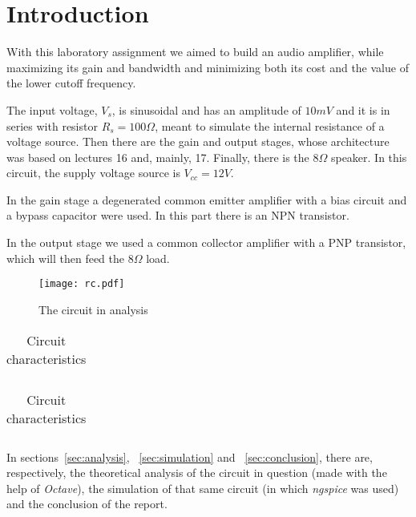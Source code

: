 \section{Introduction}
\label {sec:introduction}


With this laboratory assignment we aimed to build an audio amplifier, while maximizing its gain and bandwidth and minimizing both its cost and the value of the lower cutoff frequency.

The input voltage, $V_s$, is sinusoidal and has an amplitude of $10 mV$ and it is in series with resistor $R_s=100 \Omega$, meant to simulate the internal resistance of a voltage source. Then there are the gain and output stages, whose architecture was based on lectures 16 and, mainly, 17. Finally, there is the $8 \Omega$ speaker. In this circuit, the supply voltage source is $V_{cc}=12 V$.

In the gain stage a degenerated common emitter amplifier with a bias circuit and a bypass capacitor were used. In this part there is an NPN transistor.

In the output stage we used a common collector amplifier with a PNP transistor, which will then feed the $8 \Omega$ load.



\begin{figure}[H] \centering
\texttt{[image: rc.pdf]}
\caption{The circuit in analysis}
\label{fig:circuit}
\end{figure}


\begin{table}[H]
  \centering
  \begin{tabular}{|c|c|}
    \hline
      
  \end{tabular}
  \caption{Circuit characteristics}
  \label{tab:resistance}
\end{table}

\begin{table}[H]
  \centering
  \begin{tabular}{|c|c|}
    \hline
      
  \end{tabular}
  \caption{Circuit characteristics}
  \label{tab:resistance1}
\end{table}

In sections~\ref{sec:analysis}, ~\ref{sec:simulation} and ~\ref{sec:conclusion}, there are, respectively, the theoretical analysis of the circuit in question (made with the help of \textit{Octave}), the simulation of that same circuit (in which \textit{ngspice} was used) and the conclusion of the report.
